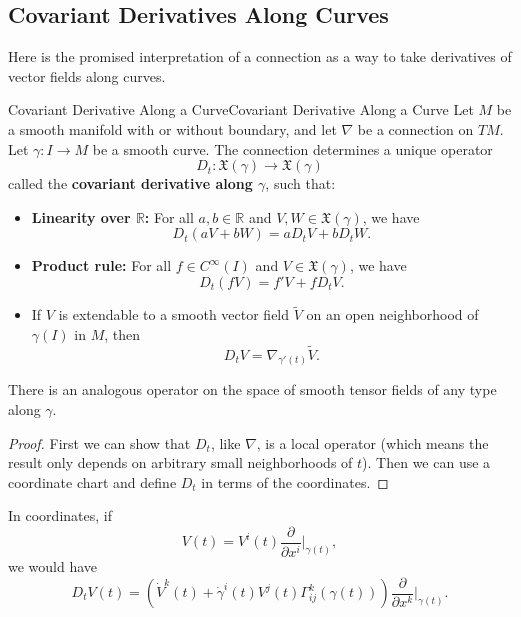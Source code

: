 \documentclass[../main.tex]{subfiles}
\begin{document}
\subsection{Covariant Derivatives Along Curves}
Here is the promised interpretation of a connection as a way to take derivatives of vector fields along curves.

\begin{theorem}{Covariant Derivative Along a Curve}{Covariant Derivative Along a Curve}
	Let $M$ be a smooth manifold with or without boundary, and let $\nabla$ be a connection on $TM$. Let $\gamma: I \to M$ be a smooth curve. The connection determines a unique operator
	\begin{equation}
		D_t: \mathfrak{X}(\gamma) \to \mathfrak{X}(\gamma)
	\end{equation}
	called the \textbf{covariant derivative along $\gamma$}, such that:
	\begin{itemize}
		\item \textbf{Linearity over $\mathbb{R}$:} For all $a, b \in \mathbb{R}$ and $V, W \in \mathfrak{X}(\gamma)$, we have
		  \begin{equation}
			  D_t(a V + b W) = a D_t V + b D_t W.
		  \end{equation}
		\item \textbf{Product rule:} For all $f \in C^{\infty}(I)$ and $V \in \mathfrak{X}(\gamma)$, we have
		  \begin{equation}
			  D_t(f V) = f' V + f D_t V.
		  \end{equation}
		\item If $V$ is extendable to a smooth vector field $\tilde{V}$ on an open neighborhood of $\gamma(I)$ in $M$, then
		  \begin{equation}
			  D_t V = \nabla_{\gamma'(t)} \tilde{V}.
		  \end{equation}
	\end{itemize}
	There is an analogous operator on the space of smooth tensor fields of any type along $\gamma$.
\end{theorem}
\begin{proof}
	First we can show that $D_t$, like $\nabla$, is a local operator (which means the result only depends on arbitrary small neighborhoods of $t$). Then we can use a coordinate chart and define $D_t$ in terms of the coordinates.
\end{proof}

In coordinates, if
\begin{equation}
	V(t) = V^i(t) \frac{\partial}{\partial x^i}\Big|_{\gamma(t)},
\end{equation}
we would have
\begin{equation}
	D_t V(t) = \left(\dot{V}^k(t) + \dot{\gamma}^i(t) V^j(t) \Gamma_{ij}^k(\gamma(t))\right) \frac{\partial}{\partial x^k}\Big|_{\gamma(t)}.
\end{equation}
\end{document}
